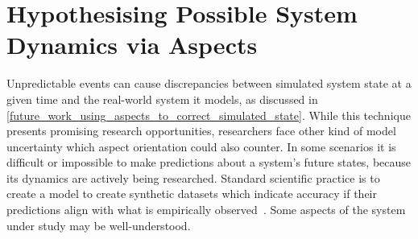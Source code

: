 



\section{Hypothesising Possible System Dynamics via Aspects}
\label{future_work_hypothesising_system_states}


Unpredictable events can cause discrepancies between simulated system state at a
given time and the real-world system it models, as discussed in
\cref{future_work_using_aspects_to_correct_simulated_state}. While this
technique presents promising research opportunities, researchers face other kind
of model uncertainty which aspect orientation could also counter. In some
scenarios it is difficult or impossible to make predictions about a system's
future states, because its dynamics are actively being researched. Standard
scientific practice is to create a model to create synthetic datasets which
indicate accuracy if their predictions align with what is empirically observed~\cite{popper1972theoryevolution}.
Some aspects of the system under study may be well-understood.

